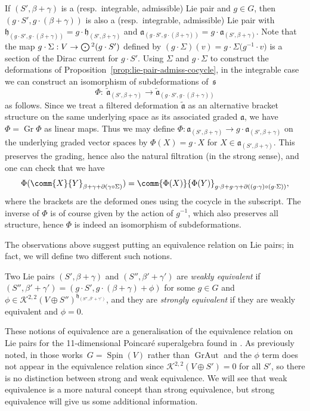 \documentclass[10pt,a4paper]{amsart}
\numberwithin{equation}{section}
\newcommand{\fa}{\mathfrak{a}}
\newcommand{\fh}{\mathfrak{h}}
\newcommand{\fs}{\mathfrak{s}}
\newcommand{\cK}{\mathcal{K}}
\newcommand{\fatilde}{\widetilde{\fa}}
\newcommand{\Odot}{\mathchoice{{\textstyle\bigodot}}{\bigodot}{\bigodot}{\bigodot}}
\newcommand{\1}{\mathbbm{1}}
\DeclareMathOperator{\Spin}{Spin}
\DeclareMathOperator{\Gr}{Gr}
\DeclareMathOperator{\GrAut}{GrAut}
\begin{document}
If $(S',\beta+\gamma)$ is a (resp.\ integrable, admissible) Lie pair and $g\in G$, then $(g\cdot S',g\cdot(\beta+\gamma))$ is also a (resp.\ integrable, admissible) Lie pair with
$\fh_{(g\cdot S',g\cdot(\beta+\gamma))}=g\cdot\fh_{(S',\beta+\gamma)}$ and $ \fa_{(g\cdot S',g\cdot(\beta+\gamma))}=g\cdot\fa_{(S',\beta+\gamma)}$.
Note that the map $g\cdot\Sigma:V\to\Odot^2(g\cdot S')$ defined by $(g\cdot\Sigma)(v)=g\cdot\Sigma\bigl(g^{-1}\cdot v\bigr)$ is a section of the Dirac current for $g\cdot S'$. Using $\Sigma$ and $g\cdot\Sigma$ to construct the deformations of Proposition~\ref{prop:lie-pair-admiss-cocycle}, in the integrable case we can construct an isomorphism of subdeformations of~$\fs$
\[
	\Phi\colon\ \fatilde_{(S',\beta+\gamma)} \to \fatilde_{(g\cdot S',g\cdot(\beta+\gamma))}
\]
as follows. Since we treat a filtered deformation $\fatilde$ as an alternative bracket structure on the same underlying space as its associated graded $\fa$, we have $\Phi=\Gr\Phi$ as linear maps. Thus we may define $\Phi\colon\fa_{(S',\beta+\gamma)}\to g\cdot\fa_{(S',\beta+\gamma)}$ on the underlying graded vector spaces by $\Phi(X)=g\cdot X$ for $X\in\fa_{(S',\beta+\gamma)}$. This preserves the grading, hence also the natural filtration (in the strong sense), and one can check that we have
\[
	\Phi(\comm{X}{Y}_{\beta+\gamma+\partial(\gamma\circ\Sigma)}) = \comm{\Phi(X)}{\Phi(Y)}_{g\cdot\beta+g\cdot\gamma+\partial((g\cdot\gamma)\circ(g\cdot\Sigma))},
\]
where the brackets are the deformed ones using the cocycle in the subscript. The inverse of $\Phi$ is of course given by the action of $g^{-1}$, which also preserves all structure, hence $\Phi$ is indeed an isomorphism of subdeformations.

The observations above suggest putting an equivalence relation on Lie pairs; in fact, we will define two different such notions.

\begin{Definition}\label{def:lie-pair-equiv}
	Two Lie pairs $(S',\beta+\gamma)$ and $(S'',\beta'+\gamma')$ are \emph{weakly equivalent} if $(S'',\beta'+\gamma')=(g\cdot S',g\cdot(\beta+\gamma)+\phi)$ for some $g\in G$ and $\phi\in\cK^{2,2}(V\oplus S'')^{\fh_{(S'',\beta'+\gamma')}}$, and they are \emph{strongly equivalent} if they are weakly equivalent and $\phi=0$.
\end{Definition}

These notions of equivalence are a generalisation of the equivalence relation on Lie pairs for the 11-dimensional Poincar\'e superalgebra found in \cite{Figueroa-OFarrill2017_1,Santi2022}. As previously noted, in those works~${G=\Spin(V)}$ rather than $\GrAut$ and the $\phi$ term does not appear in the equivalence relation since $\cK^{2,2}(V\oplus S')=0$ for all $S'$, so there is no distinction between strong and weak equivalence. We will see that weak equivalence is a more natural concept than strong equivalence, but strong equivalence will give us some additional information.
\end{document}
